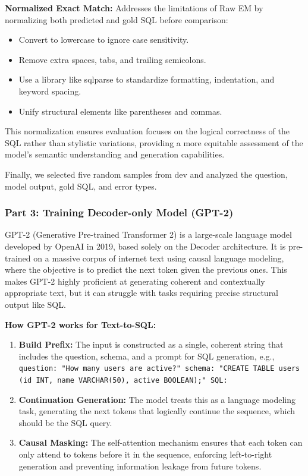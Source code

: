 \textbf{Normalized Exact Match:} Addresses the limitations of Raw EM by normalizing both predicted and gold SQL before comparison:
\begin{itemize}
    \item Convert to lowercase to ignore case sensitivity.
    \item Remove extra spaces, tabs, and trailing semicolons.
    \item Use a library like sqlparse to standardize formatting, indentation, and keyword spacing.
    \item Unify structural elements like parentheses and commas.
\end{itemize}
This normalization ensures evaluation focuses on the logical correctness of the SQL rather than stylistic variations, providing a more equitable assessment of the model's semantic understanding and generation capabilities.

Finally, we selected five random samples from dev and analyzed the question, model output, gold SQL, and error types.

\subsubsection{Part 3: Training Decoder-only Model (GPT-2)}
GPT-2 (Generative Pre-trained Transformer 2) is a large-scale language model developed by OpenAI in 2019, based solely on the Decoder architecture. It is pre-trained on a massive corpus of internet text using causal language modeling, where the objective is to predict the next token given the previous ones. This makes GPT-2 highly proficient at generating coherent and contextually appropriate text, but it can struggle with tasks requiring precise structural output like SQL.

\textbf{How GPT-2 works for Text-to-SQL:}
\begin{enumerate}
    \item \textbf{Build Prefix:} The input is constructed as a single, coherent string that includes the question, schema, and a prompt for SQL generation, e.g., \texttt{question: "How many users are active?" schema: "CREATE TABLE users (id INT, name VARCHAR(50), active BOOLEAN);" SQL: }
    \item \textbf{Continuation Generation:} The model treats this as a language modeling task, generating the next tokens that logically continue the sequence, which should be the SQL query.
    \item \textbf{Causal Masking:} The self-attention mechanism ensures that each token can only attend to tokens before it in the sequence, enforcing left-to-right generation and preventing information leakage from future tokens.
\end{enumerate}

